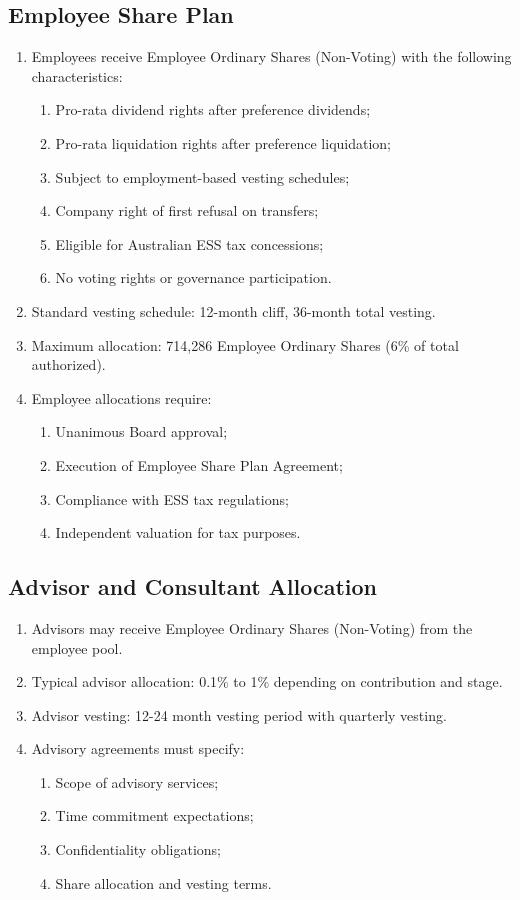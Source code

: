 \subsection{Employee Share Plan}
\begin{enumerate}[label=(\alph*)]
\item Employees receive Employee Ordinary Shares (Non-Voting) with the following characteristics:
    \begin{enumerate}[label=(\roman*)]
    \item Pro-rata dividend rights after preference dividends;
    \item Pro-rata liquidation rights after preference liquidation;
    \item Subject to employment-based vesting schedules;
    \item Company right of first refusal on transfers;
    \item Eligible for Australian ESS tax concessions;
    \item No voting rights or governance participation.
    \end{enumerate}
\item Standard vesting schedule: 12-month cliff, 36-month total vesting.
\item Maximum allocation: 714,286 Employee Ordinary Shares (6\% of total authorized).
\item Employee allocations require:
    \begin{enumerate}[label=(\roman*)]
    \item Unanimous Board approval;
    \item Execution of Employee Share Plan Agreement;
    \item Compliance with ESS tax regulations;
    \item Independent valuation for tax purposes.
    \end{enumerate}
\end{enumerate}

\subsection{Advisor and Consultant Allocation}
\begin{enumerate}[label=(\alph*)]
\item Advisors may receive Employee Ordinary Shares (Non-Voting) from the employee pool.
\item Typical advisor allocation: 0.1\% to 1\% depending on contribution and stage.
\item Advisor vesting: 12-24 month vesting period with quarterly vesting.
\item Advisory agreements must specify:
    \begin{enumerate}[label=(\roman*)]
    \item Scope of advisory services;
    \item Time commitment expectations;
    \item Confidentiality obligations;
    \item Share allocation and vesting terms.
    \end{enumerate}
\end{enumerate}

